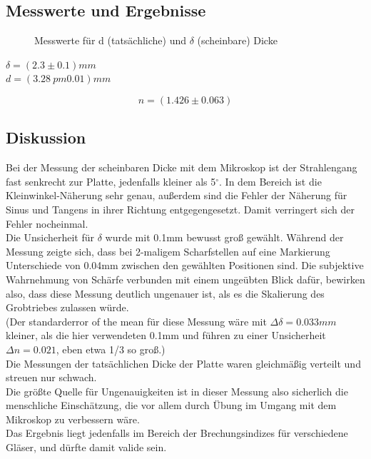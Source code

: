 \documentclass[12pt,a4paper]{article}
\begin{document}
\begin{multicols}{2}
\subsection{Messwerte und Ergebnisse}

\begin{figure}[H]
	\centering
	\caption{Messwerte für d (tatsächliche) und $\delta$ (scheinbare) Dicke}
	\label{fig:Messwerte_Glasplatte}
\end{figure}

$\delta = (2.3 \pm 0.1)mm$\\
$d = (3.28 \ pm 0.01)mm$

$$n = (1.426 \pm 0.063)$$



\subsection{Diskussion}

Bei der Messung der scheinbaren Dicke mit dem Mikroskop ist der Strahlengang fast senkrecht zur Platte, jedenfalls kleiner als 5$^\circ$. In dem Bereich ist die Kleinwinkel-Näherung sehr genau, außerdem sind die Fehler der Näherung für Sinus und Tangens in ihrer Richtung entgegengesetzt. Damit verringert sich der Fehler nocheinmal.\\
Die Unsicherheit für $\delta$ wurde mit 0.1mm bewusst groß gewählt. Während der Messung zeigte sich, dass bei 2-maligem Scharfstellen auf eine Markierung Unterschiede von  0.04mm zwischen den gewählten Positionen sind. Die subjektive Wahrnehmung von Schärfe verbunden mit einem ungeübten Blick dafür, bewirken also, dass diese Messung deutlich ungenauer ist, als es die Skalierung des Grobtriebes zulassen würde. \\
(Der standarderror of the mean für diese Messung wäre mit $\Delta \delta = 0.033mm$ kleiner, als die hier verwendeten 0.1mm und führen zu einer Unsicherheit $\Delta n = 0.021$, eben etwa 1/3 so groß.)\\
Die Messungen der tatsächlichen Dicke der Platte waren gleichmäßig verteilt und streuen nur schwach.\\
Die größte Quelle für Ungenauigkeiten ist in dieser Messung also sicherlich die menschliche Einschätzung, die vor allem durch Übung im Umgang mit dem Mikroskop zu verbessern wäre.\\
Das Ergebnis liegt jedenfalls im Bereich der Brechungsindizes für verschiedene Gläser, und dürfte damit valide sein.



\end{multicols}
\end{document}
